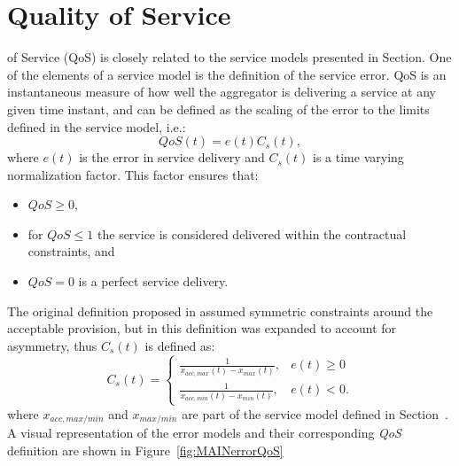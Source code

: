 \section{Quality of Service}\label{sec:MAINQoS}
 of Service (QoS) is closely related to the service models presented in Section. One of the elements of a service model is the definition of the service error. QoS is an instantaneous measure of how well the aggregator is delivering a service at any given time instant, and can be defined as the scaling of the error to the limits defined in the service model, i.e.:
\begin{equation}
	QoS(t) = e(t)C_s(t),
\end{equation}
where $e(t)$ is the error in service delivery and $C_s(t)$ is a time varying normalization factor. This factor ensures that:
\begin{itemize}
	\item $QoS \geq 0$,
	\item for $QoS \leq 1$ the service is considered delivered within the contractual constraints, and
	\item $QoS = 0$ is a perfect service delivery.
\end{itemize}

The original definition proposed in \cite{bondy2014performance} assumed symmetric constraints around the acceptable provision, but in \cite{bondy2016method} this definition was expanded to account for asymmetry, thus $C_s(t)$ is defined as:
\begin{equation}
C_{s}(t) = 
\begin{cases}
\frac{1}{x_{acc,max}(t) - x_{max}(t)}, & e(t) \geq 0 \\
\frac{1}{x_{acc,min}(t) - x_{min}(t)}, & e(t) < 0.
\end{cases}\label{eq:MAINcst}
\end{equation}
where $x_{acc,max/min}$ and $x_{max/min}$ are part of the service model defined in Section~. A visual representation of the error models and their corresponding \emph{QoS} definition are shown in Figure~\ref{fig:MAINerrorQoS}


